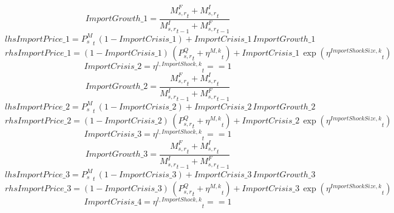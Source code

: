 \begin{dmath*}
ImportGrowth\_1 = \frac{{{M^F_{s,r}}}_{t}+{{M^I_{s,r}}}_{t}}{{{M^I_{s,r}}}_{t-1}+{{M^F_{s,r}}}_{t-1}}
\end{dmath*}
\begin{dmath*}
lhsImportPrice\_1 = {{P^{M}_s}}_{t}\, \left(1-{ImportCrisis\_1}\right)+{ImportCrisis\_1}\, {ImportGrowth\_1}
\end{dmath*}
\begin{dmath*}
rhsImportPrice\_1 = \left(1-{ImportCrisis\_1}\right)\, \left({{P^Q_{s,r}}}_{t}+{{\eta^{M,k}}}_{t}\right)+{ImportCrisis\_1}\, \exp\left({{\eta^{Import Shock Size,k}}}_{t}\right)
\end{dmath*}
\begin{dmath*}
ImportCrisis\_2 = {{\eta^{l,Import Shock,k}}}_{t}==1
\end{dmath*}
\begin{dmath*}
ImportGrowth\_2 = \frac{{{M^F_{s,r}}}_{t}+{{M^I_{s,r}}}_{t}}{{{M^I_{s,r}}}_{t-1}+{{M^F_{s,r}}}_{t-1}}
\end{dmath*}
\begin{dmath*}
lhsImportPrice\_2 = {{P^{M}_s}}_{t}\, \left(1-{ImportCrisis\_2}\right)+{ImportCrisis\_2}\, {ImportGrowth\_2}
\end{dmath*}
\begin{dmath*}
rhsImportPrice\_2 = \left(1-{ImportCrisis\_2}\right)\, \left({{P^Q_{s,r}}}_{t}+{{\eta^{M,k}}}_{t}\right)+{ImportCrisis\_2}\, \exp\left({{\eta^{Import Shock Size,k}}}_{t}\right)
\end{dmath*}
\begin{dmath*}
ImportCrisis\_3 = {{\eta^{l,Import Shock,k}}}_{t}==1
\end{dmath*}
\begin{dmath*}
ImportGrowth\_3 = \frac{{{M^F_{s,r}}}_{t}+{{M^I_{s,r}}}_{t}}{{{M^I_{s,r}}}_{t-1}+{{M^F_{s,r}}}_{t-1}}
\end{dmath*}
\begin{dmath*}
lhsImportPrice\_3 = {{P^{M}_s}}_{t}\, \left(1-{ImportCrisis\_3}\right)+{ImportCrisis\_3}\, {ImportGrowth\_3}
\end{dmath*}
\begin{dmath*}
rhsImportPrice\_3 = \left(1-{ImportCrisis\_3}\right)\, \left({{P^Q_{s,r}}}_{t}+{{\eta^{M,k}}}_{t}\right)+{ImportCrisis\_3}\, \exp\left({{\eta^{Import Shock Size,k}}}_{t}\right)
\end{dmath*}
\begin{dmath*}
ImportCrisis\_4 = {{\eta^{l,Import Shock,k}}}_{t}==1
\end{dmath*}
